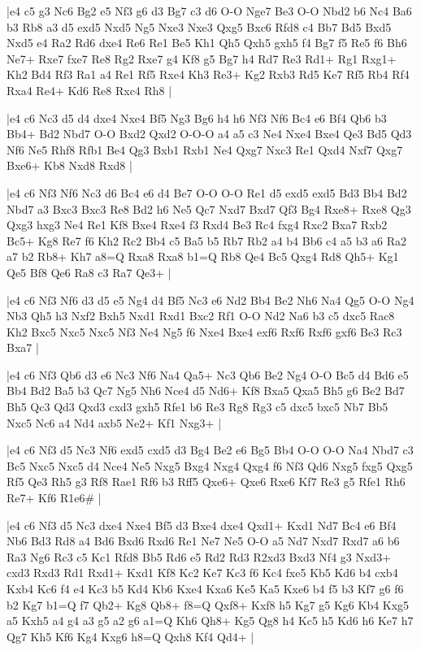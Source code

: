 \whitename{}
\blackname{}
\makegametitle
|e4 c5 g3 Nc6 Bg2 e5 Nf3 g6 d3 Bg7 c3 d6 O-O Nge7 Be3 O-O Nbd2 b6 Nc4 Ba6 b3 Rb8 a3 d5 exd5 Nxd5 Ng5 Nxe3 Nxe3 Qxg5 Bxc6 Rfd8 c4 Bb7 Bd5 Bxd5 Nxd5 e4 Ra2 Rd6 dxe4 Re6 Re1 Be5 Kh1 Qh5 Qxh5 gxh5 f4 Bg7 f5 Re5 f6 Bh6 Ne7+ Rxe7 fxe7 Re8 Rg2 Rxe7 g4 Kf8 g5 Bg7 h4 Rd7 Re3 Rd1+ Rg1 Rxg1+ Kh2 Bd4 Rf3 Ra1 a4 Re1 Rf5 Rxe4 Kh3 Re3+ Kg2 Rxb3 Rd5 Ke7 Rf5 Rb4 Rf4 Rxa4 Re4+ Kd6 Re8 Rxc4 Rh8  |

\whitename{}
\blackname{}
\makegametitle
|e4 c6 Nc3 d5 d4 dxe4 Nxe4 Bf5 Ng3 Bg6 h4 h6 Nf3 Nf6 Bc4 e6 Bf4 Qb6 b3 Bb4+ Bd2 Nbd7 O-O Bxd2 Qxd2 O-O-O a4 a5 c3 Ne4 Nxe4 Bxe4 Qe3 Bd5 Qd3 Nf6 Ne5 Rhf8 Rfb1 Be4 Qg3 Bxb1 Rxb1 Ne4 Qxg7 Nxc3 Re1 Qxd4 Nxf7 Qxg7 Bxe6+ Kb8 Nxd8 Rxd8  |

\whitename{}
\blackname{}
\makegametitle
|e4 c6 Nf3 Nf6 Nc3 d6 Bc4 e6 d4 Be7 O-O O-O Re1 d5 exd5 exd5 Bd3 Bb4 Bd2 Nbd7 a3 Bxc3 Bxc3 Re8 Bd2 h6 Ne5 Qc7 Nxd7 Bxd7 Qf3 Bg4 Rxe8+ Rxe8 Qg3 Qxg3 hxg3 Ne4 Re1 Kf8 Bxe4 Rxe4 f3 Rxd4 Be3 Rc4 fxg4 Rxc2 Bxa7 Rxb2 Bc5+ Kg8 Re7 f6 Kh2 Rc2 Bb4 c5 Ba5 b5 Rb7 Rb2 a4 b4 Bb6 c4 a5 b3 a6 Ra2 a7 b2 Rb8+ Kh7 a8=Q Rxa8 Rxa8 b1=Q Rb8 Qe4 Bc5 Qxg4 Rd8 Qh5+ Kg1 Qe5 Bf8 Qe6 Ra8 c3 Ra7 Qe3+  |

\whitename{}
\blackname{}
\makegametitle
|e4 c6 Nf3 Nf6 d3 d5 e5 Ng4 d4 Bf5 Nc3 e6 Nd2 Bb4 Be2 Nh6 Na4 Qg5 O-O Ng4 Nb3 Qh5 h3 Nxf2 Bxh5 Nxd1 Rxd1 Bxc2 Rf1 O-O Nd2 Na6 b3 c5 dxc5 Rac8 Kh2 Bxc5 Nxc5 Nxc5 Nf3 Ne4 Ng5 f6 Nxe4 Bxe4 exf6 Rxf6 Rxf6 gxf6 Be3 Rc3 Bxa7  |

\whitename{}
\blackname{}
\makegametitle
|e4 c6 Nf3 Qb6 d3 e6 Nc3 Nf6 Na4 Qa5+ Nc3 Qb6 Be2 Ng4 O-O Bc5 d4 Bd6 e5 Bb4 Bd2 Ba5 b3 Qc7 Ng5 Nh6 Nce4 d5 Nd6+ Kf8 Bxa5 Qxa5 Bh5 g6 Be2 Bd7 Bh5 Qc3 Qd3 Qxd3 cxd3 gxh5 Rfe1 b6 Re3 Rg8 Rg3 c5 dxc5 bxc5 Nb7 Bb5 Nxc5 Nc6 a4 Nd4 axb5 Ne2+ Kf1 Nxg3+  |

\whitename{}
\blackname{}
\makegametitle
|e4 c6 Nf3 d5 Nc3 Nf6 exd5 cxd5 d3 Bg4 Be2 e6 Bg5 Bb4 O-O O-O Na4 Nbd7 c3 Bc5 Nxc5 Nxc5 d4 Nce4 Ne5 Nxg5 Bxg4 Nxg4 Qxg4 f6 Nf3 Qd6 Nxg5 fxg5 Qxg5 Rf5 Qe3 Rh5 g3 Rf8 Rae1 Rf6 b3 Rff5 Qxe6+ Qxe6 Rxe6 Kf7 Re3 g5 Rfe1 Rh6 Re7+ Kf6 R1e6\#  |

\whitename{}
\blackname{}
\makegametitle
|e4 c6 Nf3 d5 Nc3 dxe4 Nxe4 Bf5 d3 Bxe4 dxe4 Qxd1+ Kxd1 Nd7 Bc4 e6 Bf4 Nb6 Bd3 Rd8 a4 Bd6 Bxd6 Rxd6 Re1 Ne7 Ne5 O-O a5 Nd7 Nxd7 Rxd7 a6 b6 Ra3 Ng6 Rc3 c5 Kc1 Rfd8 Bb5 Rd6 e5 Rd2 Rd3 R2xd3 Bxd3 Nf4 g3 Nxd3+ cxd3 Rxd3 Rd1 Rxd1+ Kxd1 Kf8 Kc2 Ke7 Kc3 f6 Kc4 fxe5 Kb5 Kd6 b4 cxb4 Kxb4 Kc6 f4 e4 Kc3 b5 Kd4 Kb6 Kxe4 Kxa6 Ke5 Ka5 Kxe6 b4 f5 b3 Kf7 g6 f6 b2 Kg7 b1=Q f7 Qb2+ Kg8 Qb8+ f8=Q Qxf8+ Kxf8 h5 Kg7 g5 Kg6 Kb4 Kxg5 a5 Kxh5 a4 g4 a3 g5 a2 g6 a1=Q Kh6 Qh8+ Kg5 Qg8 h4 Kc5 h5 Kd6 h6 Ke7 h7 Qg7 Kh5 Kf6 Kg4 Kxg6 h8=Q Qxh8 Kf4 Qd4+  |

